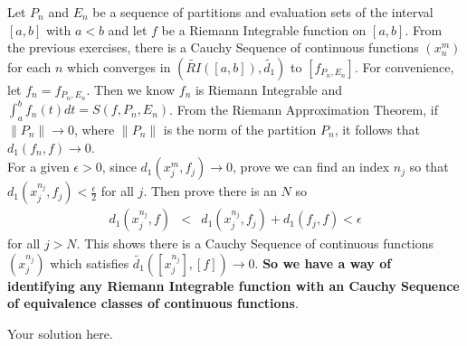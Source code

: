\documentclass[11pt]{SelfArxOneColBMN}
\begin{document}
\begin{exercise}
Let $P_n$ and $E_n$ be a sequence of partitions and evaluation sets
of the interval $[a,b]$ with $a < b$ and let $f$ be a Riemann Integrable function
on $[a,b]$.  From the previous exercises, there is a Cauchy Sequence of
continuous functions $(x_n^m)$ for each $n$ which converges in 
$(\widetilde{RI}([a,b]), \widetilde{d_1})$ to $[f_{P_n,E_n}]$.
For convenience, let $f_n = f_{P_n,E_n}$.  Then we know
$f_n$ is Riemann Integrable and $\int_a^b f_n(t) dt = S(f,P_n,E_n)$.
From the Riemann Approximation Theorem, if $\| P_n\| \rightarrow 0$,
where $\| P_n\|$ is the norm of the partition $P_n$, it follows that
$d_1(f_n,f) \rightarrow 0$.  \\

\noindent
For a given $\epsilon > 0$,
since $d_1(x_j^m,f_j) \rightarrow 0$, prove we can find an index $n_j$ so that
$d_1(x_j^{n_j},f_j) < \frac{\epsilon}{2}$ for all $j$.  Then prove there is an $N$ so
\begin{eqnarray*}
d_1(x_j^{n_j},f) &<& d_1(x_j^{n_j},f_j) + d_1(f_j,f) < \epsilon
\end{eqnarray*}
\noindent
for all $j > N$.  This shows there is a Cauchy Sequence of
continuous functions $(x_j^{n_j})$ which satisfies
$\widetilde{d_1}( [x_j^{n_j}], [f] ) \rightarrow 0$.
{\bf So we have a way of identifying any Riemann Integrable
function with an Cauchy Sequence of equivalence classes
of continuous functions}.
\end{exercise}

\begin{solution}
Your solution here.
\end{solution}


	
\end{document}
